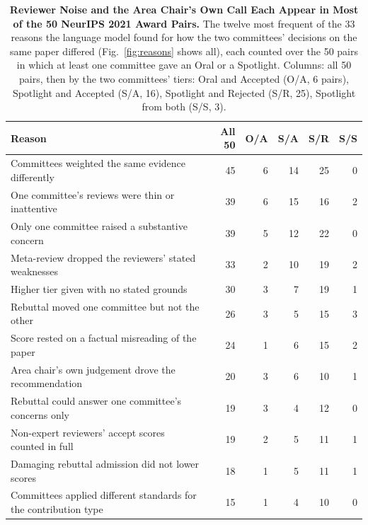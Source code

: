 \documentclass{article}
\begin{document}
\begin{table}[t]
\centering
\small
\caption{\textbf{Reviewer Noise and the Area Chair's Own Call Each Appear in Most of the 50 NeurIPS 2021 Award Pairs.} The twelve most frequent of the 33 reasons the language model found for how the two committees' decisions on the same paper differed (Fig.~\ref{fig:reasons} shows all), each counted over the 50 pairs in which at least one committee gave an Oral or a Spotlight. Columns: all 50 pairs, then by the two committees' tiers: Oral and Accepted (O/A, 6 pairs), Spotlight and Accepted (S/A, 16), Spotlight and Rejected (S/R, 25), Spotlight from both (S/S, 3).}
\label{tab:reasons}
\begin{tabular}{lrrrrr}
\toprule
Reason & All 50 & O/A & S/A & S/R & S/S \\
\midrule
Committees weighted the same evidence differently & 45 & 6 & 14 & 25 & 0 \\
One committee's reviews were thin or inattentive & 39 & 6 & 15 & 16 & 2 \\
Only one committee raised a substantive concern & 39 & 5 & 12 & 22 & 0 \\
Meta-review dropped the reviewers' stated weaknesses & 33 & 2 & 10 & 19 & 2 \\
Higher tier given with no stated grounds & 30 & 3 & 7 & 19 & 1 \\
Rebuttal moved one committee but not the other & 26 & 3 & 5 & 15 & 3 \\
Score rested on a factual misreading of the paper & 24 & 1 & 6 & 15 & 2 \\
Area chair's own judgement drove the recommendation & 20 & 3 & 6 & 10 & 1 \\
Rebuttal could answer one committee's concerns only & 19 & 3 & 4 & 12 & 0 \\
Non-expert reviewers' accept scores counted in full & 19 & 2 & 5 & 11 & 1 \\
Damaging rebuttal admission did not lower scores & 18 & 1 & 5 & 11 & 1 \\
Committees applied different standards for the contribution type & 15 & 1 & 4 & 10 & 0 \\
\bottomrule
\end{tabular}
\end{table}
\end{document}
